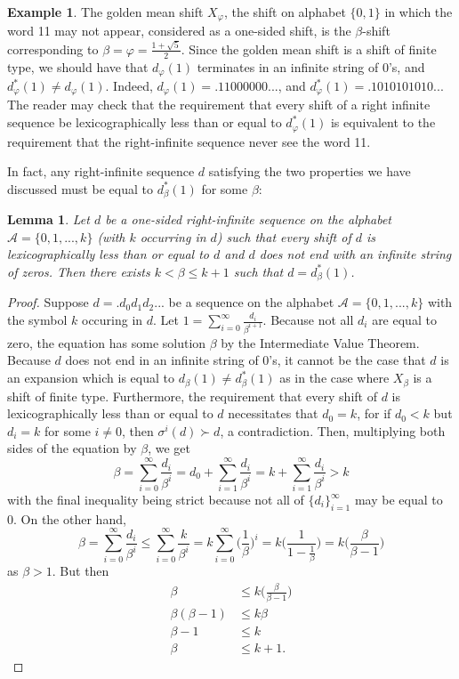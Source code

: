 \documentclass{amsart}
\newtheorem{lemma}[theorem]{Lemma}
\theoremstyle{definition}
\newtheorem{example}[theorem]{Example}
\numberwithin{equation}{section}
\begin{document}
\begin{example}\label{GMS}
The golden mean shift $X_\varphi$, the shift on alphabet $\{0,1\}$ in which the word 11 may not appear, considered as a one-sided shift, is the $\beta$-shift corresponding to $\beta = \varphi = \frac{1+\sqrt{5}}{2}$. Since the golden mean shift is a shift of finite type, we should have that $d_\varphi(1)$ terminates in an infinite string of 0's, and $d_\varphi^*(1) \neq d_\varphi(1)$. Indeed, $d_\varphi(1) = .11000000...$, and $d_\varphi^*(1) = .1010101010...$ The reader may check that the requirement that every shift of a right infinite sequence be lexicographically less than or equal to $d_\varphi^*(1)$ is equivalent to the requirement that the right-infinite sequence never see the word 11.
\end{example} 

In fact, any right-infinite sequence $d$ satisfying the two properties we have discussed must be equal to $d_\beta^*(1)$ for some $\beta$:

\begin{lemma}\label{twoprops}
Let $d$ be a one-sided right-infinite sequence on the alphabet $\mathcal{A} = \{0, 1, ..., k\}$ (with $k$ occurring in $d$) such that every shift of $d$ is lexicographically less than or equal to $d$ and $d$ does not end with an infinite string of zeros. Then there exists $k < \beta \leq k+1$ such that $d = d_\beta^*(1)$.
\end{lemma}
\begin{proof} Suppose $d = .d_0d_1d_2...$ be a sequence on the alphabet $\mathcal{A} = \{0, 1, ..., k\}$ with the symbol $k$ occuring in $d$. Let $\displaystyle 1 = \sum_{i=0}^\infty \frac{d_i}{\beta^{i+1}}$. Because not all $d_i$ are equal to zero, the equation has some solution $\beta$ by the Intermediate Value Theorem. Because $d$ does not end in an infinite string of 0's, it cannot be the case that $d$ is an expansion which is equal to $d_\beta(1) \neq d_\beta^*(1)$ as in the case where $X_\beta$ is a shift of finite type. Furthermore, the requirement that every shift of $d$ is lexicographically less than or equal to $d$ necessitates that $d_0 = k$, for if $d_0 < k$ but $d_i = k$ for some $i \neq 0$, then $\sigma^i(d) \succ d$, a contradiction. Then, multiplying both sides of the equation by $\beta$, we get 
$$\beta = \sum_{i=0}^\infty \frac{d_i}{\beta^{i}} = d_0 + \sum_{i=1}^\infty \frac{d_i}{\beta^i} = k + \sum_{i=1}^\infty \frac{d_i}{\beta^{i}}> k$$
with the final inequality being strict because not all of $\{d_i\}_{i=1}^\infty$ may be equal to 0. On the other hand,
$$\beta = \sum_{i=0}^\infty \frac{d_i}{\beta^{i}} \leq \sum_{i=0}^\infty \frac{k}{\beta^{i}} = k \sum_{i=0}^\infty \Big(\frac{1}{\beta}\Big)^i = k\Big(\frac{1}{1-\frac{1}{\beta}}\Big) = k \Big(\frac{\beta}{\beta -1}\Big)$$
as $\beta > 1$. But then
\begin{align*}
\beta &\leq k \Big(\frac{\beta}{\beta -1}\Big) \\
\beta(\beta - 1) &\leq k\beta \\
\beta - 1 &\leq k \\
\beta &\leq k + 1.
\end{align*}
\end{proof}
\end{document}
